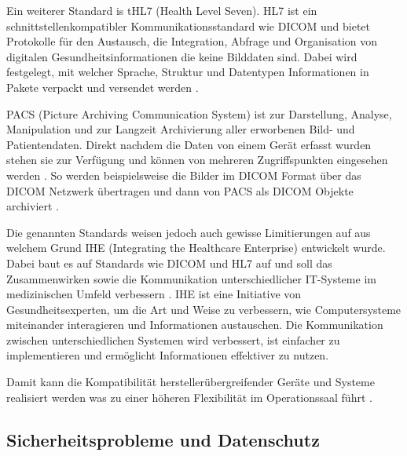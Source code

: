 Ein weiterer Standard is tHL7 (Health Level Seven). HL7 ist ein schnittstellenkompatibler Kommunikationsstandard wie DICOM \cite{DerDigitaleOperationssaal} und bietet Protokolle für den Austausch, die Integration, Abfrage und Organisation von digitalen Gesundheitsinformationen die keine Bilddaten sind. Dabei wird festgelegt, mit welcher Sprache, Struktur und Datentypen Informationen in Pakete verpackt und versendet werden \cite{HL7}.

PACS (Picture Archiving Communication System) ist zur Darstellung, Analyse, Manipulation und zur Langzeit Archivierung aller erworbenen Bild- und Patientendaten. Direkt nachdem die Daten von einem Gerät erfasst wurden stehen sie zur Verfügung und können von mehreren Zugriffspunkten eingesehen werden \cite{PACS}.
So werden beispielsweise die Bilder im DICOM Format über das DICOM Netzwerk übertragen und dann von PACS als DICOM Objekte archiviert \cite{DICOM}.

Die genannten Standards weisen jedoch auch gewisse Limitierungen auf aus welchem Grund IHE (Integrating the Healthcare Enterprise) entwickelt wurde. Dabei baut es auf Standards wie DICOM und HL7 auf und soll das Zusammenwirken sowie die Kommunikation unterschiedlicher IT-Systeme im medizinischen Umfeld verbessern \cite{DICOMundIHE}. 
IHE ist eine Initiative von Gesundheitsexperten, um die Art und Weise zu verbessern, wie Computersysteme miteinander interagieren und Informationen austauschen. Die Kommunikation zwischen unterschiedlichen Systemen wird verbessert, ist einfacher zu implementieren und ermöglicht Informationen effektiver zu nutzen\cite{IHE}.

Damit kann die Kompatibilität herstellerübergreifender Geräte und Systeme realisiert werden was zu einer höheren Flexibilität im Operationssaal führt \cite{DerDigitaleOperationssaal}.

\subsection{Sicherheitsprobleme und Datenschutz}

